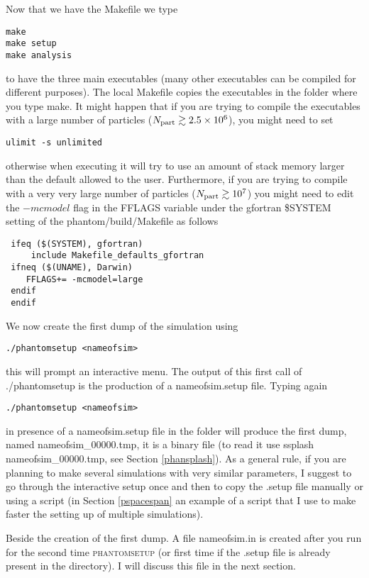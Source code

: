 \documentclass[10pt,a4paper,twoside]{article} %
\begin{document}
Now that we have the Makefile we type
\begin{verbatim}
make
make setup
make analysis
\end{verbatim}
to have the three main executables (many other executables can be compiled for different purposes). The local Makefile copies the executables in the folder where you type make. 
It might happen that if you are trying to compile the executables with a large number of particles ($N_{\rm part}\gtrsim 2.5\times 10^6$), you might need to set 
\begin{verbatim}
ulimit -s unlimited
\end{verbatim}
otherwise when executing it will try to use an amount of stack memory larger than the default allowed to the user.
Furthermore, if you are trying to compile with a very very large number of particles ($N_{\rm part}\gtrsim 10^7$) you might need to edit the $-mcmodel$ flag in the FFLAGS variable under the gfortran \$SYSTEM setting of the phantom/build/Makefile as follows
\begin{verbatim}
 ifeq ($(SYSTEM), gfortran)
     include Makefile_defaults_gfortran
 ifneq ($(UNAME), Darwin)
    FFLAGS+= -mcmodel=large
 endif
 endif
\end{verbatim}

We now create the first dump of the simulation using
\begin{verbatim}
./phantomsetup <nameofsim>
\end{verbatim}
this will prompt an interactive menu. The output of this first call of ./phantomsetup is the production of a nameofsim.setup file. Typing again
\begin{verbatim}
./phantomsetup <nameofsim>
\end{verbatim}
in presence of a nameofsim.setup file in the folder will produce the first dump, named nameofsim\_00000.tmp, it is a binary file (to read it use ssplash nameofsim\_00000.tmp, see Section \ref{phansplash}). As a general rule, if you are planning to make several simulations with very similar parameters, I suggest to go through the interactive setup once and then to copy the .setup file manually or using a script (in Section \ref{pspacespan} an example of a script that I use to make faster the setting up of multiple simulations). 

Beside the creation of the first dump. A file nameofsim.in is created after you run for the second time \textsc{phantomsetup} (or first time if the .setup file is already present in the directory). I will discuss this file in the next section.
\end{document}
